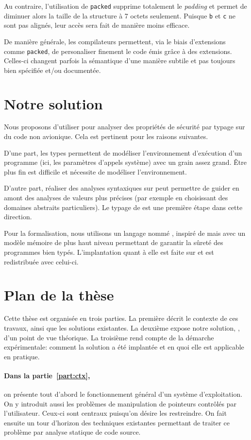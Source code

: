 Au contraire, l'utilisation de \texttt{packed} supprime totalement le
\emph{padding} et permet de diminuer alors la taille de la structure à 7 octets
seulement. Puisque \texttt{b} et \texttt{c} ne sont pas alignés, leur accès sera
fait de manière moins efficace.

De manière générale, les compilateurs permettent, via le biais d'extensions
comme \texttt{packed}, de personaliser finement le code émis grâce à des
extensions. Celles-ci changent parfois la sémantique d'une manière subtile et
pas toujours bien spécifiée et/ou documentée.

\section{Notre solution}

Nous proposons d'utiliser \newspeak pour analyser des propriétés de sécurité par
typage sur du code non avionique. Cela est pertinent pour les raisons suivantes.

D'une part, les types permettent de modéliser l'environnement d'exécution d'un
programme (ici, les paramètres d'appels système) avec un grain assez grand. Être
plus fin est difficile et nécessite de modéliser l'environnement.

D'autre part, réaliser des analyses syntaxiques sur \newspeak peut permettre de
guider en amont des analyses de valeurs plus précises (par exemple en
choisissant des domaines abstraits particuliers). Le typage de \newspeak est une
première étape dans cette direction.

Pour la formalisation, nous utilisons un langage nommé \langname, inspiré de
\newspeak mais avec un modèle mémoire de plus haut niveau permettant de garantir
la sûreté des programmes bien typés. L'implantation quant à elle est faite sur
\newspeak et est redistribuée avec celui-ci.

\section{Plan de la thèse}

Cette thèse est organisée en trois parties. La première décrit le contexte de
ces travaux, ainsi que les solutions existantes. La deuxième expose notre
solution, \langname, d'un point de vue théorique. La troisième rend compte de la
démarche expérimentale: comment la solution a été implantée et en quoi elle est
applicable en pratique.

\paragraph{Dans la partie~\ref{part:ctx},} on présente tout d'abord le
fonctionnement général d'un système d'exploitation. On y introduit aussi les
problèmes de manipulation de pointeurs contrôlés par l'utilisateur. Ceux-ci sont
centraux puisqu'on désire les restreindre. On fait ensuite un tour d'horizon des
techniques existantes permettant de traiter ce problème par analyse statique de
code source.

